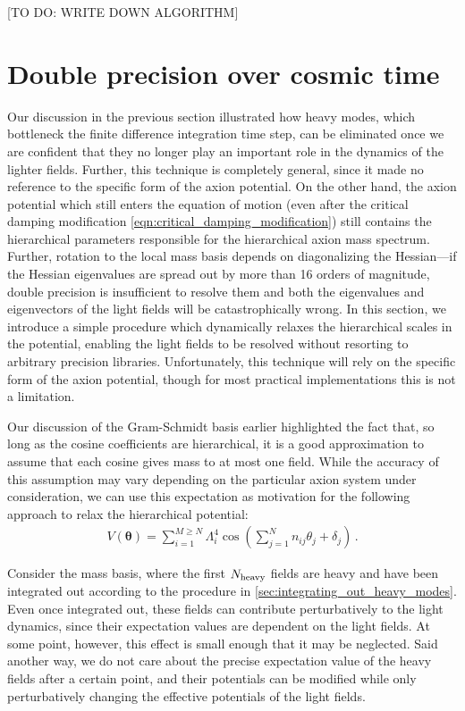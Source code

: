 \documentclass[11pt]{article}
\begin{document}
[TO DO: WRITE DOWN ALGORITHM]

\section{Double precision over cosmic time}\label{sec:double_precision_over_cosmic_time}
Our discussion in the previous section illustrated how heavy modes, which bottleneck the finite difference integration time step, can be eliminated once we are confident that they no longer play an important role in the dynamics of the lighter fields. Further, this technique is completely general, since it made no reference to the specific form of the axion potential. On the other hand, the axion potential which still enters the equation of motion (even after the critical damping modification \cref{eqn:critical_damping_modification}) still contains the hierarchical parameters responsible for the hierarchical axion mass spectrum. Further, rotation to the local mass basis depends on diagonalizing the Hessian---if the Hessian eigenvalues are spread out by more than 16 orders of magnitude, double precision is insufficient to resolve them and both the eigenvalues and eigenvectors of the light fields will be catastrophically wrong. In this section, we introduce a simple procedure which dynamically relaxes the hierarchical scales in the potential, enabling the light fields to be resolved without resorting to arbitrary precision libraries. Unfortunately, this technique will rely on the specific form of the axion potential, though for most practical implementations this is not a limitation.

Our discussion of the Gram-Schmidt basis earlier highlighted the fact that, so long as the cosine coefficients are hierarchical, it is a good approximation to assume that each cosine gives mass to at most one field. While the accuracy of this assumption may vary depending on the particular axion system under consideration, we can use this expectation as motivation for the following approach to relax the hierarchical potential:
\begin{align}
    V({\bm\theta}) = \sum_{i = 1}^{M\geq N}\Lambda_i^4\cos\left(\sum_{j = 1}^N n_{ij}\theta_j + \delta_j\right)\,.
\end{align}

Consider the mass basis, where the first $N_{\rm heavy}$ fields are heavy and have been integrated out according to the procedure in \cref{sec:integrating_out_heavy_modes}. Even once integrated out, these fields can contribute perturbatively to the light dynamics, since their expectation values are dependent on the light fields. At some point, however, this effect is small enough that it may be neglected. Said another way, we do not care about the precise expectation value of the heavy fields after a certain point, and their potentials can be modified while only perturbatively changing the effective potentials of the light fields.
\end{document}
